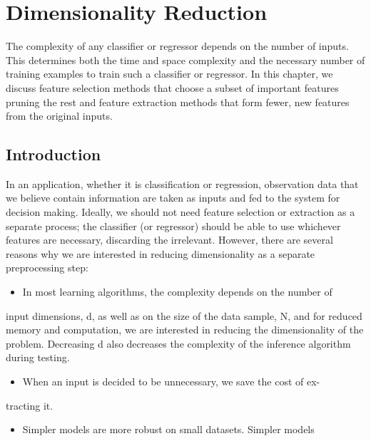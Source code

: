 \chapter{Dimensionality Reduction}
\label{chap:06-dimensionality-reduction}

The complexity of any classifier or regressor depends on the number of inputs. This determines both the time and space complexity and the necessary number of training examples to train such a classifier or regressor. In this chapter, we discuss feature selection methods that choose a subset of important features pruning the rest and feature extraction methods that form fewer, new features from the original inputs.

\section{Introduction}

In an application, whether it is classification or regression, observation data that we believe contain information are taken as inputs and fed to the system for decision making. Ideally, we should not need feature selection or extraction as a separate process; the classifier (or regressor) should be able to use whichever features are necessary, discarding the irrelevant. However, there are several reasons why we are interested in reducing dimensionality as a separate preprocessing step:

\begin{itemize}
\item In most learning algorithms, the complexity depends on the number of
\end{itemize}

input dimensions, d, as well as on the size of the data sample, N, and for reduced memory and computation, we are interested in reducing the dimensionality of the problem. Decreasing d also decreases the complexity of the inference algorithm during testing.

\begin{itemize}
\item When an input is decided to be unnecessary, we save the cost of ex-
\end{itemize}

tracting it.

\begin{itemize}
\item Simpler models are more robust on small datasets. Simpler models
\end{itemize}

